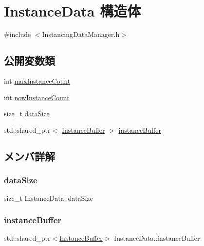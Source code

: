 \hypertarget{struct_instance_data}{}\section{Instance\+Data 構造体}
\label{struct_instance_data}


{\ttfamily \#include $<$Instancing\+Data\+Manager.\+h$>$}

\subsection*{公開変数類}
\begin{DoxyCompactItemize}
\item 
int \mbox{\hyperlink{struct_instance_data_a69db34a789452ed153c183c96160c3b3}{max\+Instance\+Count}}
\item 
int \mbox{\hyperlink{struct_instance_data_af9849ce55582ae4992c1bdf591ae6498}{now\+Instance\+Count}}
\item 
size\+\_\+t \mbox{\hyperlink{struct_instance_data_ad66831fe4608710e86b761093e5eca39}{data\+Size}}
\item 
std\+::shared\+\_\+ptr$<$ \mbox{\hyperlink{class_instance_buffer}{Instance\+Buffer}} $>$ \mbox{\hyperlink{struct_instance_data_a530d3392eebfe9f8ef5081921add21bc}{instance\+Buffer}}
\end{DoxyCompactItemize}


\subsection{メンバ詳解}
\mbox{\label{struct_instance_data_ad66831fe4608710e86b761093e5eca39}} 
\subsubsection{\texorpdfstring{data\+Size}{dataSize}}
{\footnotesize\ttfamily size\+\_\+t Instance\+Data\+::data\+Size}

\mbox{\label{struct_instance_data_a530d3392eebfe9f8ef5081921add21bc}} 
\subsubsection{\texorpdfstring{instance\+Buffer}{instanceBuffer}}
{\footnotesize\ttfamily std\+::shared\+\_\+ptr$<$\mbox{\hyperlink{class_instance_buffer}{Instance\+Buffer}}$>$ Instance\+Data\+::instance\+Buffer}

